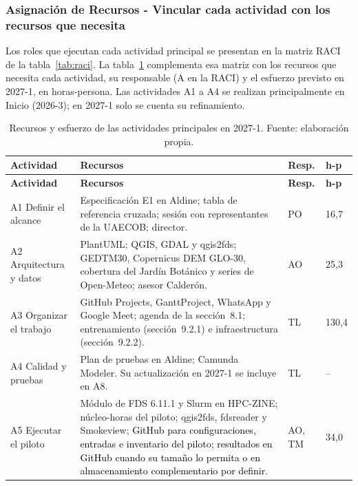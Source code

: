 
\subsubsection{Asignación de Recursos - Vincular cada actividad con los recursos que necesita}\label{sec:spmp-9-3-3}

Los roles que ejecutan cada actividad principal se presentan en la matriz RACI de la tabla~\ref{tab:raci}. La tabla~\ref{tab:recursos} complementa esa matriz con los recursos que necesita cada actividad, su responsable (A en la RACI) y el esfuerzo previsto en 2027-1, en horas-persona. Las actividades A1 a A4 se realizan principalmente en Inicio (2026-3); en 2027-1 solo se cuenta su refinamiento.
 
\begin{longtable}{|p{}|p{}|p{}|p{}|}
\caption{Recursos y esfuerzo de las actividades principales en 2027-1. Fuente: elaboración propia.}\label{tab:recursos}\\
\hline
\textbf{Actividad} & \textbf{Recursos} & \textbf{Resp.} & \textbf{h-p}\tabularnewline\hline
\endfirsthead
\hline
\textbf{Actividad} & \textbf{Recursos} & \textbf{Resp.} & \textbf{h-p}\tabularnewline\hline
\endhead

\raggedright A1 Definir el alcance & \raggedright Especificación E1 en Aldine; tabla de referencia cruzada; sesión con representantes de la UAECOB; director. & PO & 16,7\tabularnewline\hline

\raggedright A2 Arquitectura y datos & \raggedright PlantUML; QGIS, GDAL y qgis2fds; GEDTM30, Copernicus DEM GLO-30, cobertura del Jardín Botánico y series de Open-Meteo; asesor Calderón. & AO & 25,3\tabularnewline\hline

\raggedright A3 Organizar el trabajo & \raggedright GitHub Projects, GanttProject, WhatsApp y Google Meet; agenda de la sección~8.1; entrenamiento (sección~9.2.1) e infraestructura (sección~9.2.2). & TL & 130,4\tabularnewline\hline

\raggedright A4 Calidad y pruebas & \raggedright Plan de pruebas en Aldine; Camunda Modeler. Su actualización en 2027-1 se incluye en A8. & TL & --\tabularnewline\hline

\raggedright A5 Ejecutar el piloto & \raggedright Módulo de FDS 6.11.1 y Slurm en HPC-ZINE; núcleo-horas del piloto; qgis2fds, fdsreader y Smokeview; \textcolor{black}{GitHub para configuraciones, entradas e inventario del piloto; resultados en GitHub cuando su tamaño lo permita o en almacenamiento complementario por definir}. & AO, TM & 34,0\tabularnewline\hline


\end{longtable}
